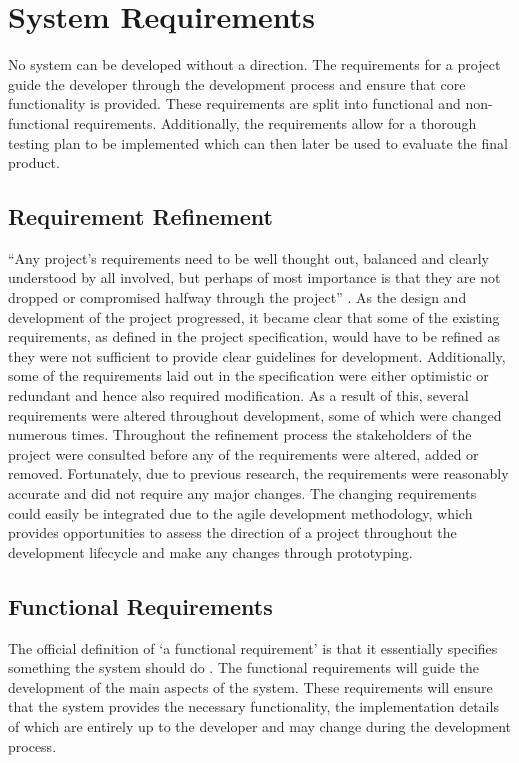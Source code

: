 \section{System Requirements} \label{Section:Requirements}
No system can be developed without a direction. The requirements for a project guide the developer through the development process and ensure that core functionality is provided. These requirements are split into functional and non-functional requirements. Additionally, the requirements allow for a thorough testing plan to be implemented which can then later be used to evaluate the final product. 

\subsection{Requirement Refinement} ``Any project’s requirements need to be well thought out, balanced and clearly understood by all involved, but perhaps of most importance is that they are not dropped or compromised halfway through the project'' \cite{ReQTest:Requirements}. As the design and development of the project progressed, it became clear that some of the existing requirements, as defined in the project specification, would have to be refined as they were not sufficient to provide clear guidelines for development. Additionally, some of the requirements laid out in the specification were either optimistic or redundant and hence also required modification. As a result of this, several requirements were altered throughout development, some of which were changed numerous times. Throughout the refinement process the stakeholders of the project were consulted before any of the requirements were altered, added or removed. Fortunately, due to previous research, the requirements were reasonably accurate and did not require any major changes. The changing requirements could easily be integrated due to the agile development methodology, which provides opportunities to assess the direction of a project throughout the development lifecycle and make any changes through prototyping\cite{Agile:Home}.

\subsection{Functional Requirements} \label{Section:Functional_Requirements}
The official definition of ‘a functional requirement’ is that it essentially specifies something the system should do \cite{ReQTest:Requirements}. The functional requirements will guide the development of the main aspects of the system. These requirements will ensure that the system provides the necessary functionality, the implementation details of which are entirely up to the developer and may change during the development process.

